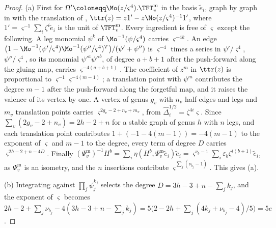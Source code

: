 \begin{proof}
(a) First for $\Omega'\coloneqq\Mo(z/\varsigma^4).\TFT^{\mathrm m}_v$ in the basis $\tilde e_i$, graph by graph in \cite[Def.~2.2]{PPZ15} with the translation of \cite[Def.~2.13]{PPZ15}, $\ttr(z)=z1'-z\Mo(z/\varsigma^4)^{-1}1'$, where $1'=\varsigma^{-1}\sum_i\zeta^i\tilde e_i$ is the unit of $\TFT^{\mathrm m}_v$. Every ingredient is free of $\varsigma$ except the following. A leg monomial $\psi^k$ of $\Mo^{-1}(\psi/\varsigma^4)$ carries $\varsigma^{-4k}$. An edge $\bigl(1-\Mo^{-1}(\psi'/\varsigma^4)\Mo^{-1}(\psi''/\varsigma^4)^T\bigr)/(\psi'+\psi'')$ is $\varsigma^{-4}$ times a series in $\psi'/\varsigma^4$, $\psi''/\varsigma^4$, so its monomial $\psi'^a\psi''^b$, of degree $a+b+1$ after the push-forward along the gluing map, carries $\varsigma^{-4(a+b+1)}$. The coefficient of $z^m$ in $\ttr(z)$ is proportional to $\varsigma^{-1}\varsigma^{-4(m-1)}$; a translation point with $\psi^m$ contributes the degree $m-1$ after the push-forward along the forgetful map, and it raises the valence of its vertex by one. A vertex of genus $g_v$ with $n_v$ half-edges and legs and $m_v$ translation points carries $\varsigma^{2g_v-2+n_v+m_v}$, from $\hat\Delta_i^{1/2}=\zeta^{4i}\varsigma$. Since $\sum_v(2g_v-2+n_v)=2h-2+n$ for a stable graph of genus $h$ with $n$ legs, and each translation point contributes $1+(-1-4(m-1))=-4(m-1)$ to the exponent of $\varsigma$ and $m-1$ to the degree, every term of degree $D$ carries $\varsigma^{2h-2+n-4D}$. Finally $(\Psi^{\mathrm m}_v)^{-1}H^b=\sum_i\eta(H^b,\Psi^{\mathrm m}_v\tilde e_i)\tilde e_i=\varsigma^{\nu_b-1}\sum_i\varepsilon_b\zeta^{i(b+1)}\tilde e_i$, as $\Psi^{\mathrm m}_v$ is an isometry, and the $n$ insertions contribute $\varsigma^{\sum_j(\nu_{b_j}-1)}$. This gives (a).

(b) Integrating against $\prod_j\psi_j^{k_j}$ selects the degree $D=3h-3+n-\sum_jk_j$, and the exponent of $\varsigma$ becomes $2h-2+\sum_j\nu_{b_j}-4(3h-3+n-\sum_jk_j)=5\bigl(2-2h+\sum_j(4k_j+\nu_{b_j}-4)/5\bigr)=5e$.


\end{proof}
